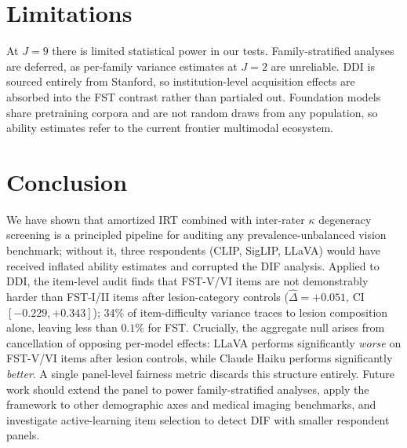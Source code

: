 \documentclass{article}
\begin{document}
\section{Limitations}
\label{sec:limitations}

At $J = 9$ there is limited statistical power in our tests. Family-stratified analyses are deferred, as per-family variance estimates at $J = 2$ are unreliable.  DDI is sourced entirely from Stanford, so institution-level acquisition effects are absorbed into the FST contrast rather than partialed out. Foundation models share pretraining corpora and are not random draws from any population, so ability estimates refer to the current frontier multimodal ecosystem.

\section{Conclusion}
\label{sec:conclusion}

We have shown that amortized IRT combined with inter-rater $\kappa$ degeneracy screening is a principled pipeline for auditing any prevalence-unbalanced vision benchmark; without it, three respondents (CLIP, SigLIP, LLaVA) would have received inflated ability estimates and corrupted the DIF analysis. Applied to DDI, the item-level audit finds that FST-V/VI items are not demonstrably harder than FST-I/II items after lesion-category controls ($\hat\Delta = +0.051$, CI $[-0.229, +0.343]$); $34\%$ of item-difficulty variance traces to lesion composition alone, leaving less than $0.1\%$ for FST. Crucially, the aggregate null arises from cancellation of opposing per-model effects: LLaVA performs significantly \emph{worse} on FST-V/VI items after lesion controls, while Claude Haiku performs significantly \emph{better}. A single panel-level fairness metric discards this structure entirely. Future work should extend the panel to power family-stratified analyses, apply the framework to other demographic axes and medical imaging benchmarks, and investigate active-learning item selection to detect DIF with smaller respondent panels.



\end{document}
